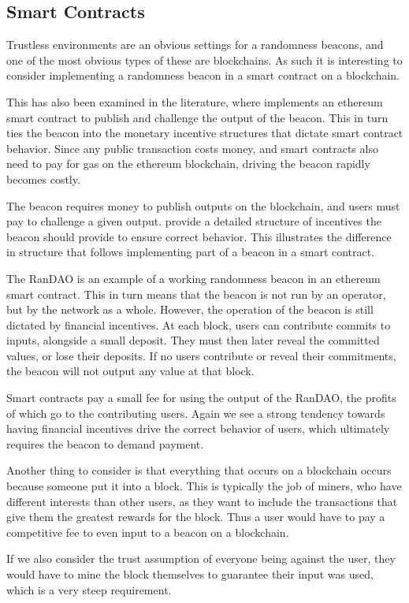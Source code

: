 \subsection{Smart Contracts}
Trustless environments are an obvious settings for a randomness beacons, and one of the most obvious types of these are blockchains. As such it is interesting to consider implementing a randomness beacon in a smart contract on a blockchain.

This has also been examined in the literature, where \citet{bunz2017proofsof} implements an ethereum smart contract to publish and challenge the output of the beacon. This in turn ties the beacon into the monetary incentive structures that dictate smart contract behavior. Since any public transaction costs money, and smart contracts also need to pay for gas on the ethereum blockchain, driving the beacon rapidly becomes costly.

The beacon requires money to publish outputs on the blockchain, and users must pay to challenge a given output. \citet{bunz2017proofsof} provide a detailed structure of incentives the beacon should provide to ensure correct behavior. This illustrates the difference in structure that follows implementing part of a beacon in a smart contract.

The RanDAO\cite{randao} is an example of a working randomness beacon in an ethereum smart contract. This in turn means that the beacon is not run by an operator, but by the network as a whole. However, the operation of the beacon is still dictated by financial incentives. At each block, users can contribute commits to inputs, alongside a small deposit. They must then later reveal the committed values, or lose their deposits. If no users contribute or reveal their commitments, the beacon will not output any value at that block.

Smart contracts pay a small fee for using the output of the RanDAO, the profits of which go to the contributing users. Again we see a strong tendency towards having financial incentives drive the correct behavior of users, which ultimately requires the beacon to demand payment.

Another thing to consider is that everything that occurs on a blockchain occurs because someone put it into a block. This is typically the job of miners, who have different interests than other users, as they want to include the transactions that give them the greatest rewards for the block. Thus a user would have to pay a competitive fee to even input to a beacon on a blockchain.

If we also consider the trust assumption of everyone being against the user, they would have to mine the block themselves to guarantee their input was used, which is a very steep requirement.
